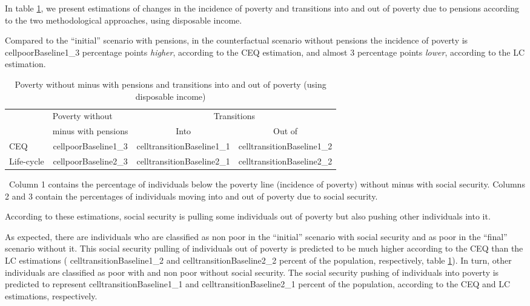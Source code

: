 \documentclass{article}
\newcommand{\Figtext}[1]{%
	\begin{tablenotes}[para,online, flushleft]
		\footnotesize
		\hspace{-0.25cm}
		#1
	\end{tablenotes}
}
\newcommand{\Fignote}[1]{\Figtext{~#1}}
\newcommand{\cellpoorBaseline}[2]{%
  \csname cellpoorBaseline#1_#2\endcsname
}
\newcommand{\celltransitionBaseline}[2]{%
  \csname celltransitionBaseline#1_#2\endcsname
}
\begin{document}
In table \ref{table:poverty}, we present estimations of changes in the incidence of poverty and transitions into and out of poverty due to pensions according to the two methodological approaches, using disposable income.   

Compared to the ``initial'' scenario with pensions, in the counterfactual scenario without pensions the incidence of poverty is \cellpoorBaseline{1}{3} percentage points \textit{higher}, according to the CEQ estimation, and almost 3 percentage points \textit{lower}, according to the LC estimation.  

 \begin{table}[!ht]
   \centering
    \begin{threeparttable}
    \caption{Poverty without minus with pensions and transitions into and out of poverty (using disposable income)}
    \label{table:poverty}
    \begin{tabular}{lccc}
	 \hline	
  \centering
    & \multicolumn{1}{l}{Poverty without}  & \multicolumn{2}{c}{Transitions} \\
      \cline{3-4}
   & minus with pensions & Into & Out of    \\
 \hline
   CEQ      & \cellpoorBaseline{1}{3}  &  \celltransitionBaseline{1}{1} & \celltransitionBaseline{1}{2}  \\
     Life-cycle    & \cellpoorBaseline{2}{3} &  \celltransitionBaseline{2}{1} & \celltransitionBaseline{2}{2} \\
     \hline
    \end{tabular}
     \Fignote{Column 1 contains the percentage of individuals below the poverty line (incidence of poverty) without minus with social security. Columns 2 and 3  contain the percentages of individuals  moving into and out of poverty due to social security. }
    \end{threeparttable}
\end{table} 


According to these estimations, social security is pulling some individuals out of poverty but also pushing other individuals into it. 

As expected, there are individuals who are classified as non poor in the ``initial'' scenario with social security and as poor in the ``final'' scenario without it. This social security pulling of individuals out of poverty is predicted to be much higher according to the CEQ than the LC estimations (\celltransitionBaseline{1}{2} and \celltransitionBaseline{2}{2} percent of the population, respectively, table \ref{table:poverty}). In turn,  other individuals are classified as poor with and non poor without social security. The social security pushing of individuals into poverty is predicted to represent \celltransitionBaseline{1}{1} and \celltransitionBaseline{2}{1} percent of the population, according to the CEQ and LC estimations, respectively.  
\end{document}
